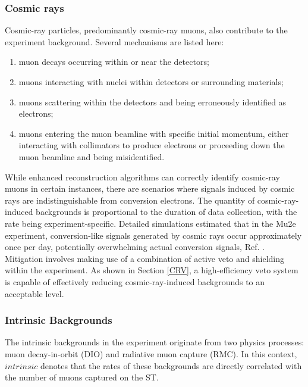 \subsubsection{Cosmic rays}
Cosmic-ray particles, predominantly cosmic-ray muons, also contribute to the experiment background. Several mechanisms are listed here:
\begin{enumerate}
    \item muon decays occurring within or near the detectors;
    \item muons interacting with nuclei within detectors or surrounding materials;
    \item muons scattering within the detectors and being erroneously identified as electrons;
    \item muons entering the muon beamline with specific initial momentum, either interacting with collimators to produce electrons or proceeding down the muon beamline and being misidentified.
\end{enumerate}

While enhanced reconstruction algorithms can correctly identify cosmic-ray muons in certain instances, there are scenarios where signals induced by cosmic rays are indistinguishable from conversion electrons. The quantity of cosmic-ray-induced backgrounds is proportional to the duration of data collection, with the rate being experiment-specific. Detailed simulations estimated that in the Mu2e experiment, conversion-like signals generated by cosmic rays occur approximately once per day, potentially overwhelming actual conversion signals, Ref. \cite{CRVposter}. Mitigation involves making use of a combination of active veto and shielding within the experiment. As shown in Section \ref{CRV}, a high-efficiency veto system is capable of effectively reducing cosmic-ray-induced backgrounds to an acceptable level.
\subsubsection{Intrinsic Backgrounds}
The intrinsic backgrounds in the experiment originate from two physics processes: muon decay-in-orbit (DIO) and radiative muon capture (RMC). In this context, $intrinsic$ denotes that the rates of these backgrounds are directly correlated with the number of muons captured on the ST.
